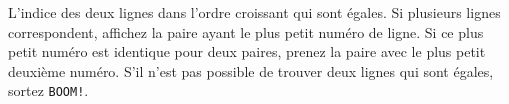 \begin{Output}
    L'indice des deux lignes dans l'ordre croissant qui sont égales. Si plusieurs lignes correspondent, affichez la paire ayant le plus petit numéro de ligne. Si ce plus petit numéro est identique pour deux paires, prenez la paire avec le plus petit deuxième numéro. S'il n'est pas possible de trouver deux lignes qui sont égales, sortez \texttt{BOOM!}.
\end{Output}
